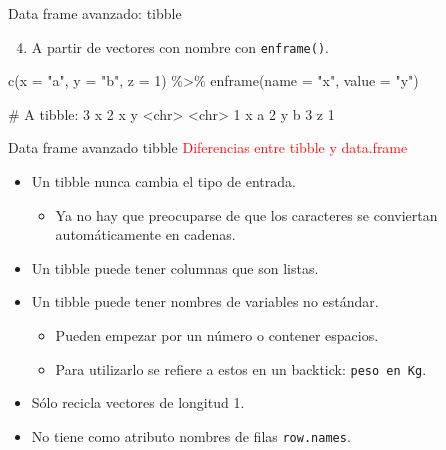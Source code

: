 \documentclass[
  ignorenonframetext,
  aspectratio=169]{beamer}
\newenvironment{Shaded}{\begin{snugshade}}{\end{snugshade}}
\newcommand{\AttributeTok}[1]{\textcolor[rgb]{0.77,0.63,0.00}{#1}}
\newcommand{\DecValTok}[1]{\textcolor[rgb]{0.00,0.00,0.81}{#1}}
\newcommand{\FunctionTok}[1]{\textcolor[rgb]{0.00,0.00,0.00}{#1}}
\newcommand{\NormalTok}[1]{#1}
\newcommand{\SpecialCharTok}[1]{\textcolor[rgb]{0.00,0.00,0.00}{#1}}
\newcommand{\StringTok}[1]{\textcolor[rgb]{0.31,0.60,0.02}{#1}}
\providecommand{\tightlist}{%
  \setlength{\itemsep}{0pt}\setlength{\parskip}{0pt}}
\let\oldverbatim\verbatim
\let\endoldverbatim\endverbatim
\renewenvironment{verbatim}{\tiny\oldverbatim}{\endoldverbatim}
\newcommand\red[1]{\textcolor{red}{#1}}
\begin{document}
\begin{frame}[fragile]{Data frame avanzado: tibble}
\protect\hypertarget{data-frame-avanzado-tibble-3}{}
\begin{enumerate}
\setcounter{enumi}{3}
\tightlist
\item
  A partir de vectores con nombre con \texttt{enframe()}.
\end{enumerate}

\begin{Shaded}
\begin{Highlighting}[]
\FunctionTok{c}\NormalTok{(}\AttributeTok{x =} \StringTok{"a"}\NormalTok{, }\AttributeTok{y =} \StringTok{"b"}\NormalTok{, }\AttributeTok{z =} \DecValTok{1}\NormalTok{) }\SpecialCharTok{\%\textgreater{}\%}
  \FunctionTok{enframe}\NormalTok{(}\AttributeTok{name =} \StringTok{"x"}\NormalTok{, }\AttributeTok{value =} \StringTok{"y"}\NormalTok{)}
\end{Highlighting}
\end{Shaded}

\begin{verbatim}
# A tibble: 3 x 2
  x     y    
  <chr> <chr>
1 x     a    
2 y     b    
3 z     1    
\end{verbatim}
\end{frame}

\begin{frame}[fragile]{Data frame avanzado tibble}
\protect\hypertarget{data-frame-avanzado-tibble-4}{}
\red{Diferencias entre tibble y data.frame}

\begin{itemize}
\item
  Un tibble nunca cambia el tipo de entrada.

  \begin{itemize}
  \tightlist
  \item
    Ya no hay que preocuparse de que los caracteres se conviertan
    automáticamente en cadenas.
  \end{itemize}
\item
  Un tibble puede tener columnas que son listas.
\item
  Un tibble puede tener nombres de variables no estándar.

  \begin{itemize}
  \tightlist
  \item
    Pueden empezar por un número o contener espacios.
  \item
    Para utilizarlo se refiere a estos en un backtick:
    \texttt{peso\ en\ Kg}.
  \end{itemize}
\item
  Sólo recicla vectores de longitud 1.
\item
  No tiene como atributo nombres de filas \texttt{row.names}.
\end{itemize}
\end{frame}
\end{document}
